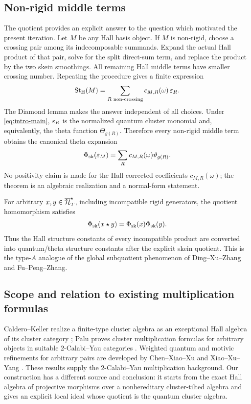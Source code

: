 \subsection*{Non-rigid middle terms}

The quotient provides an explicit answer to the question which motivated the
present iteration.  Let $M$ be any Hall basis object.  If $M$ is non-rigid,
choose a crossing pair among its indecomposable summands.  Expand the actual
Hall product of that pair, solve for the split direct-sum term, and replace the
product by the two skein smoothings.  All remaining Hall middle terms have
smaller crossing number.  Repeating the procedure gives a finite expression
\begin{equation}
 \operatorname{St}_{\mathrm H}(M)
 =\sum_{R\text{ non-crossing}}
    c_{M,R}(\omega)\,\varepsilon_R.
 \label{eq:intro-straightening}
\end{equation}
The Diamond lemma makes the answer independent of all choices.  Under
\eqref{eq:intro-main}, $\varepsilon_R$ is the normalized quantum cluster monomial and,
equivalently, the theta function $\Theta_{g(R)}$.  Therefore every non-rigid
middle term obtains the canonical theta expansion
\[
 \Phi_{\rm sk}(\varepsilon_M)
 =\sum_R c_{M,R}(\omega)\vartheta_{g(R)}.
\]
No positivity claim is made for the Hall-corrected coefficients
$c_{M,R}(\omega)$; the theorem is an algebraic realization and a normal-form
statement.

For arbitrary $x,y\in\overline{\mathcal H}_{T}^{\star}$, including incompatible rigid generators, the
quotient homomorphism satisfies
\[
 \Phi_{\rm sk}(x\star y)
 =\Phi_{\rm sk}(x)\Phi_{\rm sk}(y).
\]
Thus the Hall structure constants of every incompatible product are converted
into quantum/theta structure constants after the explicit skein quotient.
This is the type-$A$ analogue of the global subquotient phenomenon of
Ding--Xu--Zhang and Fu--Peng--Zhang.

\subsection*{Scope and relation to existing multiplication formulas}

Caldero--Keller realize a finite-type cluster algebra as an exceptional Hall
algebra of its cluster category \cite{CalderoKeller}; Palu proves cluster
multiplication formulas for arbitrary objects in suitable $2$-Calabi--Yau
categories \cite{PaluMultiplication}.  Weighted quantum and motivic refinements
for arbitrary pairs are developed by Chen--Xiao--Xu and
Xiao--Xu--Yang \cite{ChenXiaoXu,XiaoXuYang}.  These results supply the
$2$-Calabi--Yau multiplication background.  Our construction has a different
source and conclusion: it starts from the exact Hall algebra of projective
morphisms over a nonhereditary cluster-tilted algebra and gives an explicit
local ideal whose quotient is the quantum cluster algebra.

